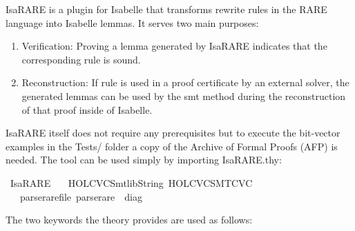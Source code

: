 %
\begin{isabellebody}%
%
%
\isadelimdocument
%
\endisadelimdocument
%
\isatagdocument
%
\isamarkuptrue%
%
\endisatagdocument
{\isafolddocument}%
%
\isadelimdocument
%
\endisadelimdocument
%
\begin{isamarkuptext}%
IsaRARE is a plugin for Isabelle that transforms rewrite rules in the RARE language into Isabelle
lemmas. It serves two main purposes:

\begin{enumerate}
\item Verification:
 Proving a lemma generated by IsaRARE indicates that the corresponding rule is sound. 

\item Reconstruction:
 If rule is used in a proof certificate by an external solver, the generated lemmas can be used by
 the smt method during the reconstruction of that proof inside of Isabelle. 
\end{enumerate}%
\end{isamarkuptext}\isamarkuptrue%
%
\isadelimdocument
%
\endisadelimdocument
%
\isatagdocument
%
\isamarkuptrue%
%
\endisatagdocument
{\isafolddocument}%
%
\isadelimdocument
%
\endisadelimdocument
%
\begin{isamarkuptext}%
IsaRARE itself does not require any prerequisites but to execute the bit-vector examples in the
Tests/ folder a copy of the Archive of Formal Proofs (AFP) is needed. The tool can be used simply
by importing IsaRARE.thy:%
\end{isamarkuptext}\isamarkuptrue%
%
\isadelimtheory
%
\endisadelimtheory
%
\isatagtheory
{}\isamarkupfalse%
\ IsaRARE\isanewline
\ \ \ {\isachardoublequoteopen}HOL{\isacharminus}{\kern0pt}CVC{\isachardot}{\kern0pt}Smtlib{\isacharunderscore}{\kern0pt}String{\isachardoublequoteclose}\ {\isachardoublequoteopen}HOL{\isacharminus}{\kern0pt}CVC{\isachardot}{\kern0pt}SMT{\isacharunderscore}{\kern0pt}CVC{\isachardoublequoteclose}\isanewline
\ \ \ {\isachardoublequoteopen}parse{\isacharunderscore}{\kern0pt}rare{\isacharunderscore}{\kern0pt}file{\isachardoublequoteclose}\ {\isachardoublequoteopen}parse{\isacharunderscore}{\kern0pt}rare{\isachardoublequoteclose}\ {\isacharcolon}{\kern0pt}{\isacharcolon}{\kern0pt}\ diag\isanewline
{}%
\endisatagtheory
{\isafoldtheory}%
%
\isadelimtheory
%
\endisadelimtheory
%
\begin{isamarkuptext}%
The two keywords the theory provides are used as follows:\\


\end{isamarkuptext}
\end{isabellebody}

